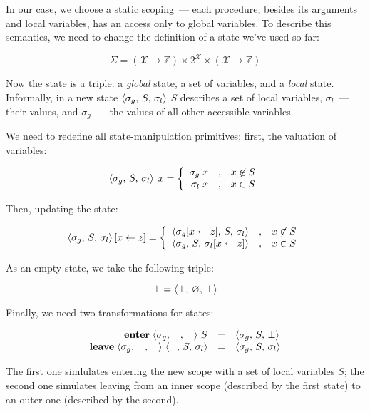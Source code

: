 In our case, we choose a static scoping~--- each procedure, besides its arguments and local variables, has an access
only to global variables.  To describe this semantics, we need to change the definition of a state we've used so far:

\[
\Sigma = (\mathscr X \to \mathbb Z) \times 2^{\mathscr X} \times (\mathscr X \to \mathbb Z)
\]

Now the state is a triple: a \emph{global} state, a set of variables, and a \emph{local} state. Informally, in a new
state $\left<{\sigma_g,\,S,\,\sigma_l}\right>$ $S$ describes a set of local variables, $\sigma_l$~--- their values, and $\sigma_g$~---
the values of all other accessible variables.

We need to redefine all state-manipulation primitives; first, the valuation of variables:

\[
\left<{\sigma_g,\,S,\,\sigma_l}\right>\;x=
  \left\{\begin{array}{rcl}
            \sigma_g\;x & , & x\not\in S\\
            \sigma_l\;x & , & x \in S
         \end{array}
  \right.
\]

Then, updating the state:

\[
\left<{\sigma_g,\,S,\,\sigma_l}\right>[x\gets z] =
  \left\{\begin{array}{rcl}
            \left<{\sigma_g[x\gets z],\,S,\,\sigma_l}\right> & , & x\not\in S\\
            \left<{\sigma_g,\,S,\,\sigma_l[x\gets z]}\right> & , & x \in S
         \end{array}
  \right.
\]

As an empty state, we take the following triple:

\[
\bot=\left<{\bot,\,\varnothing,\,\bot}\right>
\]

Finally, we need two transformations for states:

\[
\begin{array}{rcl}
  \mathbf{enter}\;{\left<{\sigma_g,\,\_,\,\_}\right>\,S} & = & \left<{\sigma_g,\,S,\,\bot}\right>\\
  \mathbf{leave}\;{\left<{\sigma_g,\,\_,\,\_}\right>\,\left<{\_,\,S,\,\sigma_l}\right>}& = & \left<{\sigma_g,\,S,\,\sigma_l}\right>
\end{array}
\]

The first one simlulates entering the new scope with a set of local variables $S$; the second one simulates leaving
from an inner scope (described by the first state) to an outer one (described by the second).

\setarrow{\xRightarrow}

